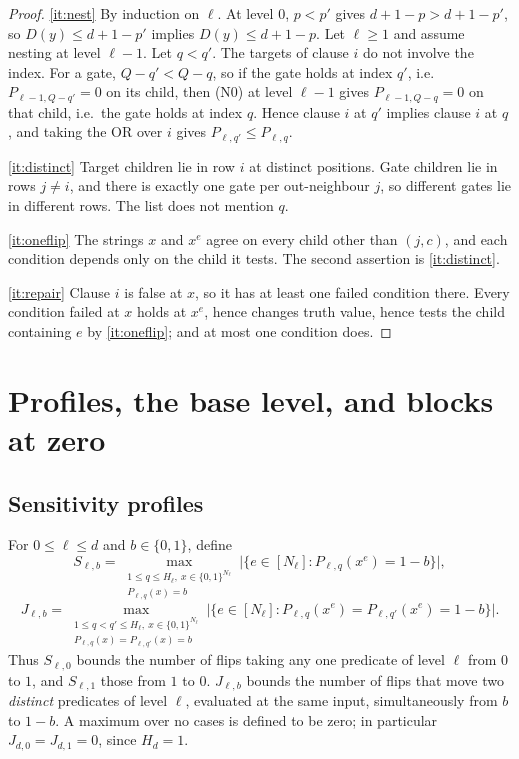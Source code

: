 \documentclass[11pt]{article}
\theoremstyle{definition}
\theoremstyle{remark}
\begin{document}
\begin{proof}
\ref{it:nest} By induction on \(\ell\). At level \(0\), \(p<p'\) gives
\(d+1-p>d+1-p'\), so \(D(y)\le d+1-p'\) implies \(D(y)\le d+1-p\). Let
\(\ell\ge1\) and assume nesting at level \(\ell-1\). Let \(q<q'\). The
targets of clause \(i\) do not involve the index. For a gate, \(Q-q'<Q-q\),
so if the gate holds at index \(q'\), i.e.\ \(P_{\ell-1,Q-q'}=0\) on its
child, then (N0) at level \(\ell-1\) gives \(P_{\ell-1,Q-q}=0\) on that
child, i.e.\ the gate holds at index \(q\). Hence clause \(i\) at \(q'\)
implies clause \(i\) at \(q\), and taking the OR over \(i\) gives
\(P_{\ell,q'}\le P_{\ell,q}\).

\ref{it:distinct} Target children lie in row \(i\) at distinct positions.
Gate children lie in rows \(j\ne i\), and there is exactly one gate per
out-neighbour \(j\), so different gates lie in different rows. The list does
not mention \(q\).

\ref{it:oneflip} The strings \(x\) and \(x^e\) agree on every child other
than \((j,c)\), and each condition depends only on the child it tests. The
second assertion is \ref{it:distinct}.

\ref{it:repair} Clause \(i\) is false at \(x\), so it has at least one failed
condition there. Every condition failed at \(x\) holds at \(x^e\), hence
changes truth value, hence tests the child containing \(e\) by
\ref{it:oneflip}; and at most one condition does.
\end{proof}

\section{Profiles, the base level, and blocks at zero}
\label{sec:profiles}

\subsection{Sensitivity profiles}
For \(0\le\ell\le d\) and \(b\in\{0,1\}\), define
\[
 S_{\ell,b}=\max_{\substack{1\le q\le H_\ell,\ x\in\{0,1\}^{N_\ell}\\
                           P_{\ell,q}(x)=b}}
 \bigl|\{e\in[N_\ell]:P_{\ell,q}(x^e)=1-b\}\bigr| ,
\]
\[
 J_{\ell,b}=\max_{\substack{1\le q<q'\le H_\ell,\ x\in\{0,1\}^{N_\ell}\\
                         P_{\ell,q}(x)=P_{\ell,q'}(x)=b}}
 \bigl|\{e\in[N_\ell]:P_{\ell,q}(x^e)=P_{\ell,q'}(x^e)=1-b\}\bigr|.
\]
Thus \(S_{\ell,0}\) bounds the number of flips taking any one predicate of
level \(\ell\) from \(0\) to \(1\), and \(S_{\ell,1}\) those from \(1\) to
\(0\). \(J_{\ell,b}\) bounds the number of flips that move two
\emph{distinct} predicates of level \(\ell\), evaluated at the same input,
simultaneously from \(b\) to \(1-b\). A maximum over no cases is defined to
be zero; in particular \(J_{d,0}=J_{d,1}=0\), since \(H_d=1\).
\end{document}
